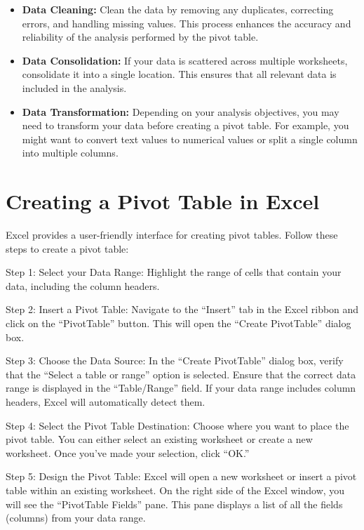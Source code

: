 \documentclass[
]{book}
\providecommand{\tightlist}{%
  \setlength{\itemsep}{0pt}\setlength{\parskip}{0pt}}
\begin{document}
\begin{itemize}
\tightlist
\item
  \textbf{Data Cleaning:} Clean the data by removing any duplicates, correcting errors, and handling missing values. This process enhances the accuracy and reliability of the analysis performed by the pivot table.
\item
  \textbf{Data Consolidation:} If your data is scattered across multiple worksheets, consolidate it into a single location. This ensures that all relevant data is included in the analysis.
\item
  \textbf{Data Transformation:} Depending on your analysis objectives, you may need to transform your data before creating a pivot table. For example, you might want to convert text values to numerical values or split a single column into multiple columns.
\end{itemize}

\hypertarget{creating-a-pivot-table-in-excel}{%
\section{Creating a Pivot Table in Excel}\label{creating-a-pivot-table-in-excel}}

Excel provides a user-friendly interface for creating pivot tables. Follow these steps to create a pivot table:

Step 1: Select your Data Range: Highlight the range of cells that contain your data, including the column headers.

Step 2: Insert a Pivot Table: Navigate to the ``Insert'' tab in the Excel ribbon and click on the ``PivotTable'' button. This will open the ``Create PivotTable'' dialog box.

Step 3: Choose the Data Source: In the ``Create PivotTable'' dialog box, verify that the ``Select a table or range'' option is selected. Ensure that the correct data range is displayed in the ``Table/Range'' field. If your data range includes column headers, Excel will automatically detect them.

Step 4: Select the Pivot Table Destination: Choose where you want to place the pivot table. You can either select an existing worksheet or create a new worksheet. Once you've made your selection, click ``OK.''

Step 5: Design the Pivot Table: Excel will open a new worksheet or insert a pivot table within an existing worksheet. On the right side of the Excel window, you will see the ``PivotTable Fields'' pane. This pane displays a list of all the fields (columns) from your data range.
\end{document}
